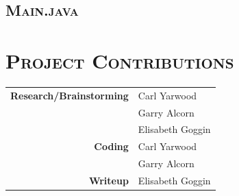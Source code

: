 \documentclass[12pt]{article}
\begin{document}
	\subsection[Main]{\hspace*{1em}\large{}\selectfont\scshape Main.java}
	
	
	\section[Project Contributions]{\Large{}\selectfont\scshape Project Contributions}
	
	\begin{center}
		{\scshape\small
		\begin{tabular}{r l}
			\bfseries Research/Brainstorming & Carl Yarwood\\
			& Garry Alcorn\\
			& Elisabeth Goggin\\
			\bfseries Coding & Carl Yarwood\\
			& Garry Alcorn\\
			\bfseries Writeup & Elisabeth Goggin\\
		\end{tabular}
		}
	\end{center}
	
\end{document}
